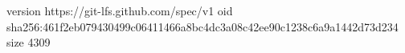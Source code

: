 version https://git-lfs.github.com/spec/v1
oid sha256:461f2eb079430499c06411466a8bc4dc3a08c42ee90c1238c6a9a1442d73d234
size 4309
